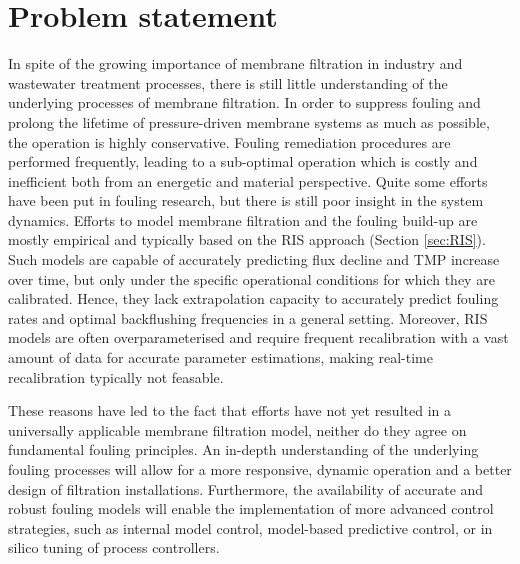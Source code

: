 \section{Problem statement}
In spite of the growing importance of membrane filtration in industry and wastewater treatment processes, there is still little understanding of the underlying processes of membrane filtration. In order to 
suppress fouling and prolong the lifetime of pressure-driven membrane systems as much as possible, the operation is highly conservative. Fouling remediation procedures %
are performed frequently, leading to a sub-optimal operation %
which is costly and inefficient both from an energetic and material perspective. Quite some efforts have been put in fouling research, but there is still poor insight in the system dynamics. Efforts to model membrane filtration and the fouling build-up are mostly empirical and typically based on the \gls{RIS} approach (Section \ref{sec:RIS}). Such models are capable of accurately predicting flux decline and \gls{TMP} increase over time, but only under the specific operational conditions for which they are calibrated. Hence, they lack extrapolation capacity to accurately predict fouling rates and optimal backflushing frequencies in a general setting. %
Moreover, \gls{RIS} models are often overparameterised and %
require frequent recalibration with a vast amount of data for accurate parameter estimations, making real-time recalibration typically not feasable. 

These reasons have led to the fact that efforts have not yet resulted in a universally applicable membrane filtration model, neither do they agree on fundamental fouling principles. An in-depth understanding of the underlying fouling processes will allow for a more responsive, dynamic operation and a better design of filtration installations. Furthermore, the availability of accurate and robust fouling models will enable the implementation of more advanced control strategies, such as internal model control, model-based predictive control, or in silico tuning of process controllers. \par


